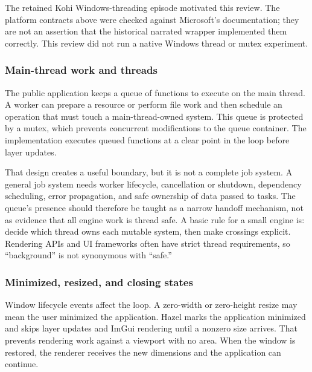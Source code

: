 The retained Kohi Windows-threading episode motivated this review. The platform contracts above were checked against Microsoft's documentation; they are not an assertion that the historical narrated wrapper implemented them correctly. This review did not run a native Windows thread or mutex experiment.

\subsubsection{Main-thread work and threads}\label{05-engine-i-ch013-main-thread-work-and-threads}

\hypertarget{05-engine-i-ch013-main-thread-work-and-threads}{}

The public application keeps a queue of functions to execute on the main thread. A worker can prepare a resource or perform file work and then schedule an operation that must touch a main-thread-owned system. This queue is protected by a mutex, which prevents concurrent modifications to the queue container. The implementation executes queued functions at a clear point in the loop before layer updates.

That design creates a useful boundary, but it is not a complete job system. A general job system needs worker lifecycle, cancellation or shutdown, dependency scheduling, error propagation, and safe ownership of data passed to tasks. The queue's presence should therefore be taught as a narrow handoff mechanism, not as evidence that all engine work is thread safe. A basic rule for a small engine is: decide which thread owns each mutable system, then make crossings explicit. Rendering APIs and UI frameworks often have strict thread requirements, so ``background'' is not synonymous with ``safe.''

\subsubsection{Minimized, resized, and closing states}\label{05-engine-i-ch013-minimized-resized-and-closing-states}

\hypertarget{05-engine-i-ch013-minimized-resized-and-closing-states}{}

Window lifecycle events affect the loop. A zero-width or zero-height resize may mean the user minimized the application. Hazel marks the application minimized and skips layer updates and ImGui rendering until a nonzero size arrives. That prevents rendering work against a viewport with no area. When the window is restored, the renderer receives the new dimensions and the application can continue.

